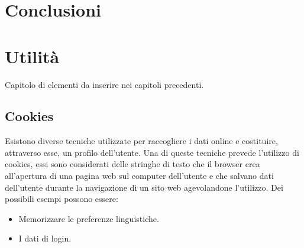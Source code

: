 \documentclass[a4paper,final,12pt]{report}
\begin{document}
\chapter{Conclusioni}

\chapter{Utilità}
Capitolo di elementi da inserire nei capitoli precedenti.

\section{Cookies}
Esistono diverse tecniche utilizzate per raccogliere i dati online e costituire, attraverso esse, un profilo dell'utente. Una di queste tecniche prevede l'utilizzo di cookies, essi sono considerati delle stringhe di testo che il browser crea all'apertura di una pagina web sul computer dell'utente e che salvano dati dell'utente durante la navigazione di un sito web agevolandone l'utilizzo. Dei possibili esempi possono essere:
\begin{itemize}
\item Memorizzare le preferenze linguistiche.
\item I dati di login.
\end{itemize}
\end{document}
